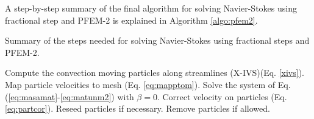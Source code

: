 A step-by-step summary of the final algorithm for solving Navier-Stokes using fractional step and PFEM-2 is explained in Algorithm \ref{algo:pfem2}.
%
\begin{algorithm}[H]
\caption{Summary of the steps needed for solving Navier-Stokes using fractional steps and PFEM-2.}
\label{algo:pfem2}
\begin{algorithmic}[1]
\STATE Compute the convection moving particles along streamlines (X-IVS)(Eq. \ref{xivs}).
\STATE Map particle velocities to mesh (Eq. \ref{eq:mapptom}).
\STATE Solve the system of Eq. (\ref{eq:masamat}-\ref{eq:matunm2}) with $\beta=0$.
\STATE Correct velocity on particles (Eq. \ref{eq:partcor}).
\STATE Reseed particles if necessary.
\STATE Remove particles if allowed.
\end{algorithmic}
\end{algorithm} 
%
